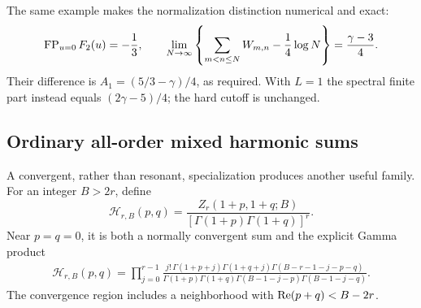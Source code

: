 The same example makes the normalization distinction numerical and exact:
\begin{equation}\label{dhr:eq:normalization-example}
 \operatorname{FP}_{u=0}F_2(u)=-\frac13,\qquad
 \lim_{N\to\infty}\left\{\sum_{m<n\leq N}W_{m,n}
                              -\frac14\log N\right\}
 =\frac{\gamma-3}{4}.
\end{equation}
Their difference is $A_1=(5/3-\gamma)/4$, as required. With $L=1$
the spectral finite part instead equals $(2\gamma-5)/4$; the hard
cutoff is unchanged.

\subsection{Ordinary all-order mixed harmonic sums}
A convergent, rather than resonant, specialization produces another
useful family. For an integer $B>2r$, define
\begin{equation}\label{dhr:eq:mixed-generator}
 \mathcal H_{r,B}(p,q)=
 \frac{Z_r(1+p,1+q;B)}{[\Gamma(1+p)\Gamma(1+q)]^r}.
\end{equation}
Near $p=q=0$, it is both a normally convergent sum and the explicit
Gamma product
\begin{align}
 \mathcal H_{r,B}(p,q)
 =\prod_{j=0}^{r-1}
 \frac{j!\,\Gamma(1+p+j)\Gamma(1+q+j)
              \Gamma(B-r-1-j-p-q)}
 {\Gamma(1+p)\Gamma(1+q)
              \Gamma(B-1-j-p)\Gamma(B-1-j-q)}.
 \label{dhr:eq:mixed-product}
\end{align}
The convergence region includes a neighborhood with
$\operatorname{Re}(p+q)<B-2r$.

